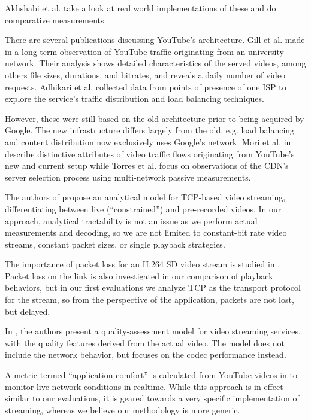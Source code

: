 Akhshabi et al. \cite{akhshabi2011experimental} take a look at real world implementations of these and do comparative measurements.

There are several publications discussing YouTube's architecture. Gill et al. made in \cite{gill2007youtube} a long-term observation of YouTube traffic originating from an university network. Their analysis shows detailed characteristics of the served videos, among others file sizes, durations, and bitrates, and reveals a daily number of video requests. Adhikari et al. \cite{adhikari2010youtube} collected data from points of presence of one ISP to explore the service's traffic distribution and load balancing techniques.

However, these were still based on the old architecture prior to being acquired by Google. The new infrastructure differs largely from the old, e.g. load balancing and content distribution now exclusively uses Google’s network. Mori et al. in \cite{mori2010characterizing} describe distinctive attributes of video traffic flows originating from YouTube's new and current setup while Torres et al. \cite{torres2011dissecting} focus on observations of the CDN's server selection process using multi-network passive measurements.


The authors of \cite{wang2003model} propose an analytical model for TCP-based video streaming, differentiating between live (``constrained'') and pre-recorded videos. In our approach, analytical tractability is not an issue as we perform actual measurements and decoding, so we are not limited to constant-bit rate video streams, constant packet sizes, or single playback strategies.

The importance of packet loss for an H.264 SD video stream is studied in \cite{pv2010loss}. Packet loss on the link is also investigated in our comparison of playback behaviors, but in our first evaluations we analyze TCP as the transport protocol for the stream, so from the perspective of the application, packets are not lost, but delayed.


In \cite{pv2010qoe}, the authors present a quality-assessment model for video streaming services, with the quality features derived from the actual video. The model does not include the network behavior, but focuses on the codec performance instead. 

A metric termed ``application comfort'' is calculated from YouTube videos in \cite{staehle2010yomo} to monitor live network conditions in realtime. While this approach is in effect similar to our evaluations, it is geared towards a very specific implementation of streaming, whereas we believe our methodology is more generic.

